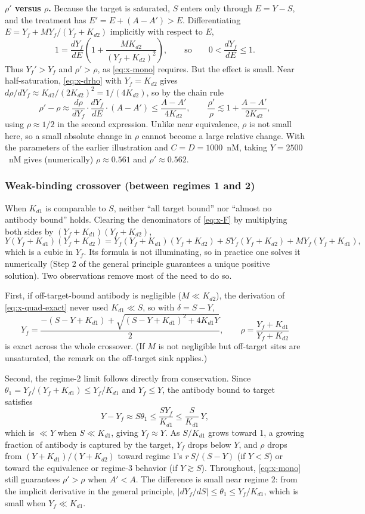 \textbf{$\rho'$ versus $\rho$.} Because the target is saturated, $S$ enters
only through $E=Y-S$, and the treatment has
$E'=E+(A-A')>E$. Differentiating $E=Y_f+MY_f/(Y_f+K_{d2})$ implicitly with
respect to $E$,
$$
1=\frac{dY_f}{dE}\left(1+\frac{MK_{d2}}{(Y_f+K_{d2})^2}\right),
\qquad\text{so}\qquad
0<\frac{dY_f}{dE}\le1.
$$
Thus $Y_f'>Y_f$ and $\rho'>\rho$, as \eqref{eq:x-mono} requires. But the
effect is small. Near half-saturation, \eqref{eq:x-drho} with $Y_f=K_{d2}$
gives $d\rho/dY_f\approx K_{d2}/(2K_{d2})^2=1/(4K_{d2})$, so by the chain rule
$$
\rho'-\rho
\approx\frac{d\rho}{dY_f}\cdot\frac{dY_f}{dE}\cdot(A-A')
\le\frac{A-A'}{4K_{d2}},
\qquad
\frac{\rho'}{\rho}\lesssim1+\frac{A-A'}{2K_{d2}},
$$
using $\rho\approx1/2$ in the second expression. Unlike near equivalence,
$\rho$ is not small here, so a small absolute change in $\rho$ cannot become
a large relative change. With the parameters of the earlier illustration
and $C=D=1000$~nM, taking $Y=2500$~nM gives (numerically) $\rho\approx0.561$
and $\rho'\approx0.562$.

\subsubsection{Weak-binding crossover (between regimes 1 and 2)}

When $K_{d1}$ is comparable to $S$, neither ``all target bound'' nor
``almost no antibody bound'' holds. Clearing the denominators of
\eqref{eq:x-F} by multiplying both sides by $(Y_f+K_{d1})(Y_f+K_{d2})$,
$$
Y(Y_f+K_{d1})(Y_f+K_{d2})
=Y_f(Y_f+K_{d1})(Y_f+K_{d2})+SY_f(Y_f+K_{d2})+MY_f(Y_f+K_{d1}),
$$
which is a cubic in $Y_f$. Its formula is not illuminating, so in practice
one solves it numerically (Step 2 of the general principle guarantees a
unique positive solution). Two observations remove most of the need to do
so.

First, if off-target-bound antibody is negligible ($M\ll K_{d2}$), the
derivation of \eqref{eq:x-quad-exact} never used $K_{d1}\ll S$, so with
$\delta=S-Y$,
$$
Y_f=\frac{-(S-Y+K_{d1})+\sqrt{(S-Y+K_{d1})^2+4K_{d1}Y}}{2},
\qquad
\rho=\frac{Y_f+K_{d1}}{Y_f+K_{d2}}
$$
is exact across the whole crossover. (If $M$ is not negligible but
off-target sites are unsaturated, the remark on the off-target sink applies.)

Second, the regime-2 limit follows directly from conservation. Since
$\theta_1=Y_f/(Y_f+K_{d1})\le Y_f/K_{d1}$ and $Y_f\le Y$, the antibody bound
to target satisfies
$$
Y-Y_f\approx S\theta_1\le\frac{SY_f}{K_{d1}}\le\frac{S}{K_{d1}}\,Y,
$$
which is $\ll Y$ when $S\ll K_{d1}$, giving $Y_f\approx Y$. As $S/K_{d1}$
grows toward 1, a growing fraction of antibody is captured by the target,
$Y_f$ drops below $Y$, and $\rho$ drops from $(Y+K_{d1})/(Y+K_{d2})$ toward
regime 1's $r\,S/(S-Y)$ (if $Y<S$) or toward the equivalence or regime-3
behavior (if $Y\gtrsim S$). Throughout, \eqref{eq:x-mono} still guarantees
$\rho'>\rho$ when $A'<A$. The difference is small near regime 2: from the
implicit derivative in the general principle, $|dY_f/dS|\le\theta_1\le
Y_f/K_{d1}$, which is small when $Y_f\ll K_{d1}$.

